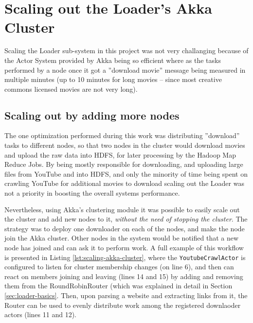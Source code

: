 %



\section{Scaling out the Loader's Akka Cluster}
\label{sec:scaling-akka}

Scaling the Loader sub-system in this project was not very challanging because of the Actor System provided by Akka being so efficient where as the tasks performed by a node once it got a ''download movie'' message being measured in multiple minutes (up to 10 minutes for long movies -- since most creative commons licensed movies are not very long).

\subsection{Scaling out by adding more nodes}
\label{sec:scaling-akka-out}

The one optimization performed during this work was distributing ''download'' tasks to different nodes, so that two nodes in the cluster would download movies and upload the raw data into HDFS, for later processing by the Hadoop Map Reduce Jobs. By being mostly responsible for downloading, and uploading large files from YouTube and into HDFS, and only the minority of time being spent on crawling YouTube for additional movies to download scaling out the Loader was not a priority in boosting the overall systems performance.

Nevertheless, using Akka's clustering module it was possible to easily scale out the cluster and add new nodes to it, \textit{without the need of stopping the cluster}. The strategy was to deploy one downloader on each of the nodes, and make the node join the Akka cluster. Other nodes in the system would be notified that a new node has joined and can ask it to perform work. A full example of this workflow is presented in Listing \ref{lst:scaling-akka-cluster}, where the \verb|YoutubeCrawlActor| is configured to listen for cluster membership changes (on line 6), and then can react on members joining and leaving (lines 14 and 15) by adding and removing them from the RoundRobinRouter (which was explained in detail in Section \ref{sec:loader-basics}. Then, upon parsing a website and extracting links from it, the Router can be used to evenly distribute work among the registered downlaoder actors (lines 11 and 12).


